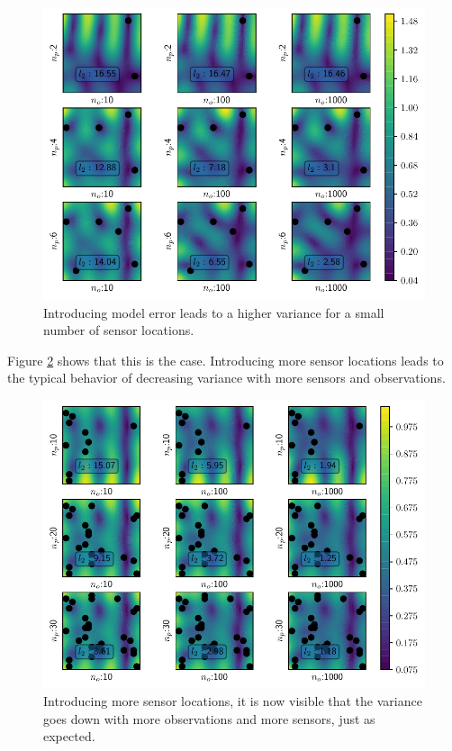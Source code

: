 \documentclass[%
  a4paper,oneside,%
  11pt,%
  smallchapters,
  style=printdev,
  extramargin,
  green,%
  rgb, <cmyk>
  ]{tubsbook}
\begin{document}
\begin{figure}[!ht]
\includegraphics[width=.9\textwidth]{../../Python/Results/2D/100procent_d/VarField_Posterior.pdf}
\centering
\caption{Introducing model error leads to a higher variance for a small number of sensor locations.}
\label{fig:100procent_d}
\end{figure}
Figure \ref{fig:100procent_d_more} shows that this is the case. Introducing more sensor locations leads to the typical behavior of decreasing variance with more sensors and observations.
\begin{figure}[!ht]
\includegraphics[width=.9\textwidth]{../../Python/Results/2D/100procent_d/VarField_PosteriorMoreSensors.pdf}
\centering
\caption{Introducing more sensor locations, it is now visible that the variance goes down with more observations and more sensors, just as expected.}
\label{fig:100procent_d_more}
\end{figure}
\end{document}
